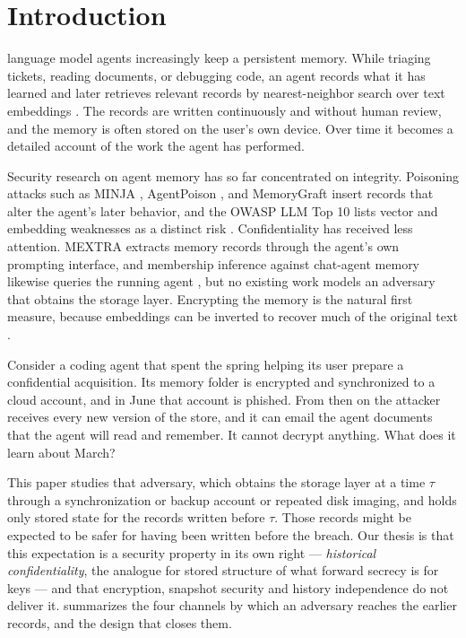 \section{Introduction}
\label{sec:intro}

 language model agents increasingly keep a persistent memory. While
triaging tickets, reading documents, or debugging code, an agent records what it has learned and
later retrieves relevant records by nearest-neighbor search over text embeddings
\cite{packer2023memgpt}. The records are written continuously and without human review, and the
memory is often stored on the user's own device. Over time it becomes a detailed account of the
work the agent has performed.

Security research on agent memory has so far concentrated on integrity. Poisoning attacks such
as MINJA \cite{dong2025minja}, AgentPoison \cite{chen2024agentpoison}, and MemoryGraft
\cite{srivastava2025memorygraft} insert records that alter the agent's later behavior, and the
OWASP LLM Top 10 lists vector and embedding weaknesses as a distinct risk
\cite{owasp2025llm08}. Confidentiality has received less attention. MEXTRA \cite{mextra2025}
extracts memory records through the agent's own prompting interface, and membership inference
against chat-agent memory likewise queries the running agent \cite{mrmmia2026}, but no existing
work models an adversary that obtains the storage layer. Encrypting the memory is the natural first
measure, because embeddings can be inverted to recover much of the original text
\cite{morris2023text}.

Consider a coding agent that spent the spring helping its user prepare a confidential acquisition.
Its memory folder is encrypted and synchronized to a cloud account, and in June that account is
phished. From then on the attacker receives every new version of the store, and it can email the
agent documents that the agent will read and remember. It cannot decrypt anything. What does it
learn about March?

This paper studies that adversary, which obtains the storage layer at a time $\tau$ through a
synchronization or backup account or repeated disk imaging, and holds only stored state for the
records written before $\tau$. Those records might be expected to be safer for having been written
before the breach. Our thesis is that this expectation is a security property in its own right --- \emph{historical confidentiality}, the analogue for stored
structure of what forward secrecy is for keys --- and that encryption, snapshot security and history
independence do not deliver it.  summarizes the four channels by which an
adversary reaches the earlier records, and the design that closes them.

